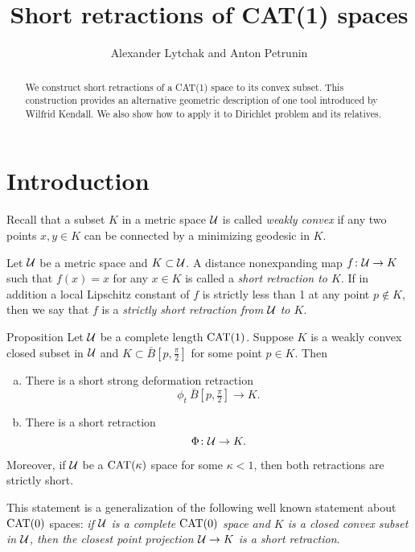 \documentclass[oneside,a4paper, 12pt]{article}
\begin{document}
\title{Short retractions of CAT(1) spaces}
\author{Alexander Lytchak and Anton Petrunin}
\date{}
\maketitle

\begin{abstract}
We construct short retractions of a CAT(1) space to its convex subset.
This construction provides an alternative geometric description of one tool introduced by Wilfrid Kendall. 
We also show how to apply it to Dirichlet problem and its relatives.
\end{abstract}


\section{Introduction}

Recall that a  subset $K$ in a metric space ${\mathcal{U}}$ is called \emph{weakly convex} if any two points $x,y\in K$ can be connected by a minimizing geodesic in $K$.

Let ${\mathcal{U}}$ be a metric space and $K\subset {\mathcal{U}}$.
A distance nonexpanding map $f\colon{\mathcal{U}}\to K$ such that $f(x)=x$ for any $x\in K$ is called a \emph{short retraction to $K$}.
If in addition a local Lipschitz constant of $f$ is strictly less than 1 at any point $p\notin K$, 
then we say that $f$ is a \emph{strictly short retraction from ${\mathcal{U}}$ to $K$}.  

\begin{thm}{Proposition}\label{thm:retraction:Phi}
Let $\mathcal{U}$ be a complete length $\mathrm{CAT}(1)$.
 Suppose $K$ is a weakly convex closed subset in $\mathcal{U}$ and $K\subset \bar B[p,\tfrac\pi2]$ for some point $p\in K$.
Then 
\begin{enumerate}[(a)]
 \item There is a short strong deformation retraction
\[\phi_t\:\bar B[p,\tfrac\pi2]\to K.\]
 \item There is a short retraction 
\[\Phi\colon\mathcal{U}\to K.\]
\end{enumerate}
Moreover, if $\mathcal{U}$ be a $\mathrm{CAT}(\kappa)$ space for some $\kappa<1$, then both retractions are strictly short.
\end{thm}

This statement is a generalization of the following well known statement about $\mathrm{CAT}(0)$ spaces:
\emph{if ${\mathcal{U}}$ is a complete $\mathrm{CAT}(0)$ space and $K$ is a closed convex subset in ${\mathcal{U}}$,
then the closest point projection ${\mathcal{U}}\to K$ is a short retraction}.
\end{document}
